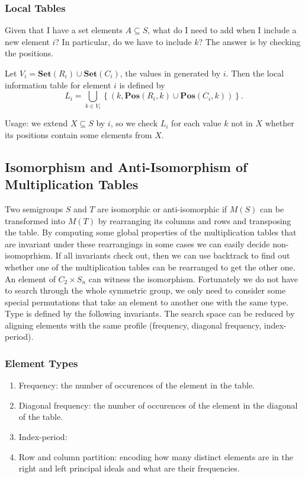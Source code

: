 \documentclass{amsart}
\newcommand{\Set}{\mathbf{Set}}
\newcommand{\Pos}{\mathbf{Pos}}
\theoremstyle{plain}
\theoremstyle{definition}
\begin{document}
\subsubsection{Local Tables} Given that I have a set elements $A\subseteq S$, what do I need to add when I include a new element $i$?
In particular, do we have to include $k$? The answer is by checking the positions. 

Let $V_i=\Set(R_i)\cup\Set(C_i)$, the values in generated by $i$. Then the  local information table for element $i$ is defined by
$$L_i=\bigcup_{k\in V_i}\left\{(k,\Pos(R_i,k)\cup\Pos(C_i,k))\right\}.$$

Usage: we extend $X\subseteq S$ by $i$, so we check $L_i$ for each value $k$ not in $X$ whether its positions contain some elements from $X$. 
\subsection{Isomorphism and Anti-Isomorphism of Multiplication Tables}
Two semigroups $S$ and $T$ are isomorphic or anti-isomorphic if $M(S)$ can be transformed into $M(T)$ by rearranging its columns and rows and transposing the table.
By computing some global properties of the multiplication tables that are invariant under these rearrangings in some cases we can easily decide non-isomoprhism.
If all invariants check out, then we can use backtrack to find out whether one of the multiplication tables can be rearranged to get the other one.
An element of $C_2\times S_n$ can witness the isomorphism.
Fortunately we do not have to search through the whole symmetric group, we only need to consider some special permutations that take an element to another one with the same type.
Type is defined by the following invariants.
The search space can be reduced by aligning elements with the same profile (frequency, diagonal frequency, index-period).

\subsubsection{Element Types}

\begin{enumerate}
\item Frequency: the number of occurences of the element in the table.
\item Diagonal frequency: the number of occurences of the element in the diagonal of the table.
\item Index-period: 
\item Row and column partition: encoding how many distinct elements are in the right and left principal ideals and what are their frequencies.
\end{enumerate} 
\end{document}
